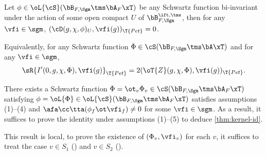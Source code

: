 \documentclass[article, a4paper, twoside]{universal}
\begin{document}
\begin{thm}\label{thm:kernel-id}
    Let $\phi\in\oL{\cS}(\bB_{F,\Sgm}\tms\bA_{F}\xT)$ be any Schwartz function bi-invariant under the action of some open compact $U$ of $\bB_{F,\Sgm}^{\ift,\tms}$, then for any $\vfi\in\sgm$, $(\cD(g,\chi,\phi)_{U},\vfi(g))_{\T{Pet}}=0$.

    Equivalently, for any Schwartz function $\Phi\in\cS(\bB_{F,\Sgm}\tms\bA\xT)$ and for any $\vfi\in\sgm$,
    \[
        \sR{I'(0,g,\chi,\Phi),\vfi(g)}_{\T{Pet}}=2(\oT{Z}(g,\chi,\Phi),\vfi(g))_{\T{Pet}}.
    \]
\end{thm}

\begin{thm}\label{thm:kernel-id-conditional}
    There exists a Schwartz function $\Phi=\ot_{v}\Phi_{v}\in\cS(\bB_{F,\Sgm}\tms\bA_{F}\xT)$ satisfying $\phi=\oL{\Phi}\in\oL{\cS}(\bB_{F,\Sgm}\tms\bA_{F}\xT)$ satisfies assumptions (1)--(4) and $\afa\cc\tta(\phi_{f}\ot\vfi_{f})\neq0$ for some $\vfi\in\sgm$. As a result, it suffices to prove the identity under assumptions (1)--(5) to deduce \cref{thm:kernel-id}.
\end{thm}

\begin{prf}
    This result is local, to prove the existence of $(\Phi_{v},\vfi_{v})$ for each $v$, it suffices to treat the case $v\in S_{1}$ (\cite[Proposition~5.11]{YZZ2013}) and $v\in S_{2}$ (\cite[Proposition~5.15]{YZZ2013}).
\end{prf}
\end{document}
